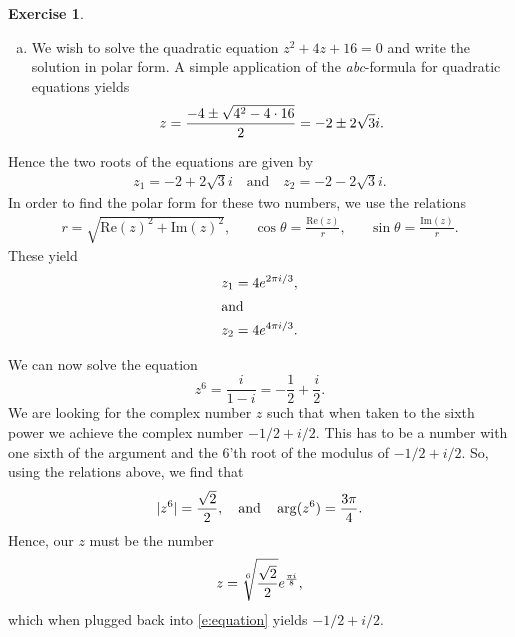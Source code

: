 \documentclass[a4paper]{amsart}
\newcommand{\Rez}[1]{\mathrm{Re}(#1)}
\newcommand{\Imz}[1]{\mathrm{Im}(#1)}
\theoremstyle{definition}
\newtheorem{exercise}{Exercise}
\begin{document}
\begin{exercise}\hfill
  \begin{enumerate}[a)]
    \item We wish to solve the quadratic equation $z^2 + 4z + 16 = 0$ and write the solution in polar form.
      A simple application of the \emph{abc}-formula for quadratic equations yields
      \begin{equation}
        \notag
        z = \frac{-4 \pm \sqrt{4^2 - 4\cdot 16}}{2} = -2 \pm 2\sqrt{3}i.
      \end{equation}
  \end{enumerate} 
  Hence the two roots of the equations are given by
  \begin{align*}
    z_1 = -2 + 2\sqrt{3}i \quad \text{and} \quad z_2 = -2 - 2\sqrt{3}i.
  \end{align*}
  In order to find the polar form for these two numbers, we use the relations
  \begin{align*}
    r = \sqrt{\Rez{z}^2 + \Imz{z}^2}, && \cos\theta = \frac{\Rez{z}}{r}, && \sin\theta = \frac{\Imz{z}}{r}.
  \end{align*}
  These yield
  \begin{align*}
    z_1 = 4e^{2\pi i /3}, \\
    \intertext{and}
    z_2 = 4e^{4\pi i/ 3}.
  \end{align*}
  \item We can now solve the equation
    \begin{equation}
      \label{e:equation} 
      z^6 = \frac{i}{1-i} = -\frac{1}{2} + \frac{i}{2}.
    \end{equation}
    We are looking for the complex number $z$ such that when taken to the sixth
    power we achieve the complex number $-1/2 + i/2$. This has to be a number
    with one sixth of the argument and the 6'th root of the modulus of $-1/2 +
    i/2$.
    So, using the relations above, we find that
    \begin{equation}
      \notag
      |z^6| = \frac{\sqrt{2}}{2}, \quad \text{and} \quad \arg(z^6) = \frac{3\pi}{4}.
    \end{equation}
    Hence, our $z$ must be the number
    \begin{equation}
      \notag
      z = \sqrt[6]{\frac{\sqrt{2}}{2}}e^{\frac{\pi i}{8}}, 
    \end{equation}
    which when plugged back into \cref{e:equation} yields $-1/2 + i/2$.
\end{exercise}
\end{document}
